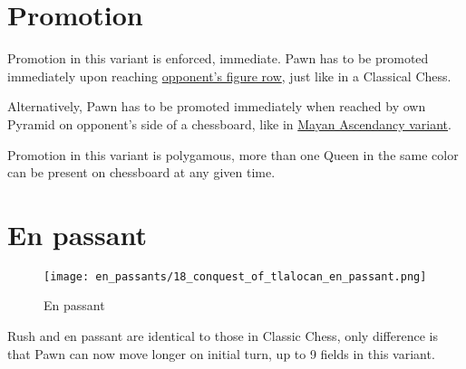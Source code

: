 \clearpage %

\section*{Promotion}

Promotion in this variant is enforced, immediate.
Pawn has to be promoted immediately upon reaching
\hyperref[fig:scn_aoa_14_pawn_figure_piece_rush_rows]{opponent's figure row},
just like in a Classical Chess.

Alternatively, Pawn has to be promoted immediately when reached by own Pyramid on
opponent's side of a chessboard, like in
\hyperref[sec:Mayan Ascendancy/Pyramid/Promotion]{Mayan Ascendancy variant}.

Promotion in this variant is polygamous, more than one Queen in the same color
can be present on chessboard at any given time.





\clearpage %

\section*{En passant}

\noindent
\begin{wrapfigure}{l}{0.4\textwidth}
\centering
\texttt{[image: en\_passants/18\_conquest\_of\_tlalocan\_en\_passant.png]}
\caption{En passant}
\label{fig:18_conquest_of_tlalocan_en_passant}
\end{wrapfigure}
Rush and en passant are identical to those in Classic Chess, only difference
is that Pawn can now move longer on initial turn, up to 9 fields in this
variant.

